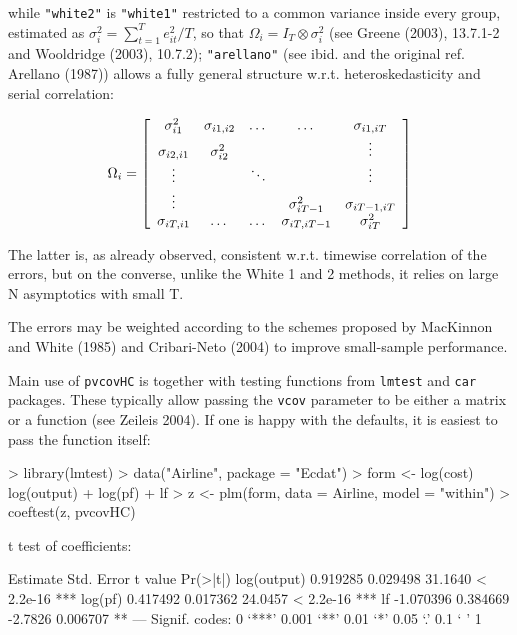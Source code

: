 \documentclass[a4paper]{article}
\begin{document}
while \texttt{"white2"} is \texttt{"white1"} restricted to a common variance inside every group, estimated as $\sigma_i^2=\sum_{t=1}^T{e_{it}^2}/T$, so that $\Omega_i=I_T \otimes \sigma_i^2$ (see Greene (2003), 13.7.1-2 and Wooldridge (2003), 10.7.2); \texttt{"arellano"} (see ibid. and the original ref. Arellano (1987)) allows a fully general structure w.r.t. heteroskedasticity and serial correlation:

\begin{equation}
 \label{eq:omegaArellano}
 \Omega_i=
 \left[ \begin{array}{c c c c c}
 \sigma_{i1}^2 & \sigma_{i1,i2}  & \dots & \dots & \sigma_{i1,iT} \\
 \sigma_{i2,i1} & \sigma_{i2}^2 & & & \vdots \\
 \vdots & & \ddots & & \vdots \\
 \vdots & & & \sigma_{iT-1}^2 & \sigma_{iT-1,iT} \\
 \sigma_{iT,i1} & \dots & \dots & \sigma_{iT,iT-1} & \sigma_{iT}^2 \\
 \end{array} \right]
\end{equation}

The latter is, as already observed, consistent w.r.t. timewise correlation of the errors, but on the converse, unlike the White 1 and 2 methods, it relies on large N asymptotics with small T. 

The errors may be weighted according to the schemes proposed by MacKinnon and White (1985) and Cribari-Neto (2004) to improve small-sample performance. 

Main use of \texttt{pvcovHC} is together with testing functions from \texttt{lmtest} and \texttt{car} packages. These typically allow passing the \texttt{vcov} parameter to be either a matrix or a function (see Zeileis 2004). If one is happy with the defaults, it is easiest to pass the function itself:

\begin{Schunk}
\begin{Sinput}
> library(lmtest)
> data("Airline", package = "Ecdat")
> form <- log(cost) ~ log(output) + log(pf) + lf
> z <- plm(form, data = Airline, model = "within")
> coeftest(z, pvcovHC)
\end{Sinput}
\begin{Soutput}
t test of coefficients:

             Estimate Std. Error t value  Pr(>|t|)    
log(output)  0.919285   0.029498 31.1640 < 2.2e-16 ***
log(pf)      0.417492   0.017362 24.0457 < 2.2e-16 ***
lf          -1.070396   0.384669 -2.7826  0.006707 ** 
---
Signif. codes:  0 ‘***’ 0.001 ‘**’ 0.01 ‘*’ 0.05 ‘.’ 0.1 ‘ ’ 1 
\end{Soutput}
\end{Schunk}
\end{document}
